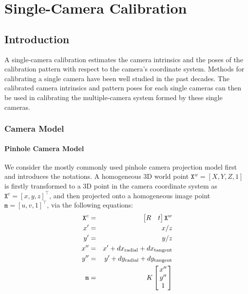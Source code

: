 \documentclass{report}
\begin{document}
\chapter{Single-Camera Calibration}
\section{Introduction}

\label{singleSec}
A single-camera calibration estimates the camera intrinsics and the poses of the calibration pattern with respect to the camera's coordinate system. Methods for calibrating a single camera have been well studied in the past decades. The calibrated camera intrinsics and pattern poses for each single cameras can then be used in calibrating the multiple-camera system formed by these single cameras. 

\subsection{Camera Model}
\subsubsection{Pinhole Camera Model}
We consider the mostly commonly used pinhole camera projection model first and introduces the notations. A homogeneous 3D world point $\mathtt{X}^w = [X, Y, Z, 1]$ is firstly transformed to a 3D point in the camera coordinate system as $\mathtt{X}^c = [x, y, z]^\top$, and then projected onto a homogeneous image point $\mathtt{m} = [u, v, 1]^\top$, via the following equations: 
\begin{eqnarray}
\label{cmEqn1}
\mathtt{X}^c &=&
\begin{bmatrix}
R & t
\end{bmatrix}
\mathtt{X}^w \\
x' &=&x / z \\ 
\label{ray2homo1}
y' &=&y / z \\
\label{ray2homo2}
x'' &=&x'  + dx_{\text{radial}} + dx_{\text{tangent}}\\
\label{cmEqn2}
y'' &=&y'  + dy_{\text{radial}} + dy_{\text{tangent}}\\
\label{cmEqn3}
\mathtt{m} &=&
K
\arraycolsep=1.5pt%
\begin{bmatrix}
	\begin{array}{c}
	x'' \\ y'' \\ 1
	\end{array}
\end{bmatrix}
\label{cmEqn4} 
\end{eqnarray}
\end{document}
